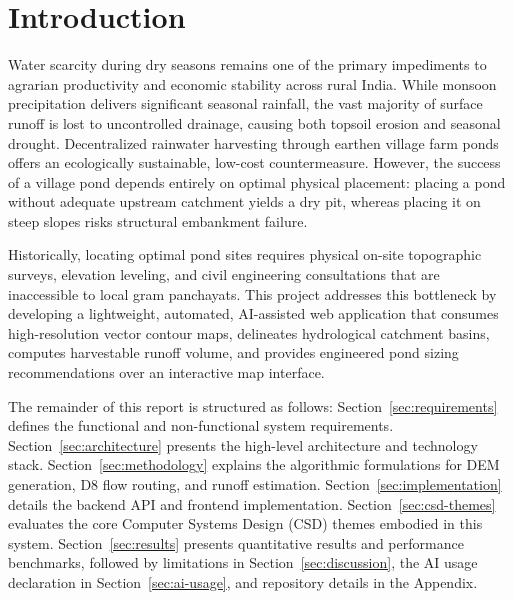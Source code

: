 \documentclass[manuscript,screen,review]{acmart}
\begin{document}

\maketitle

\section{Introduction}
\label{sec:intro}
Water scarcity during dry seasons remains one of the primary impediments to agrarian productivity and economic stability across rural India. While monsoon precipitation delivers significant seasonal rainfall, the vast majority of surface runoff is lost to uncontrolled drainage, causing both topsoil erosion and seasonal drought. Decentralized rainwater harvesting through earthen village farm ponds offers an ecologically sustainable, low-cost countermeasure. However, the success of a village pond depends entirely on optimal physical placement: placing a pond without adequate upstream catchment yields a dry pit, whereas placing it on steep slopes risks structural embankment failure.

Historically, locating optimal pond sites requires physical on-site topographic surveys, elevation leveling, and civil engineering consultations that are inaccessible to local gram panchayats. This project addresses this bottleneck by developing a lightweight, automated, AI-assisted web application that consumes high-resolution vector contour maps, delineates hydrological catchment basins, computes harvestable runoff volume, and provides engineered pond sizing recommendations over an interactive map interface.

The remainder of this report is structured as follows: Section~\ref{sec:requirements} defines the functional and non-functional system requirements. Section~\ref{sec:architecture} presents the high-level architecture and technology stack. Section~\ref{sec:methodology} explains the algorithmic formulations for DEM generation, D8 flow routing, and runoff estimation. Section~\ref{sec:implementation} details the backend API and frontend implementation. Section~\ref{sec:csd-themes} evaluates the core Computer Systems Design (CSD) themes embodied in this system. Section~\ref{sec:results} presents quantitative results and performance benchmarks, followed by limitations in Section~\ref{sec:discussion}, the AI usage declaration in Section~\ref{sec:ai-usage}, and repository details in the Appendix.
\end{document}
